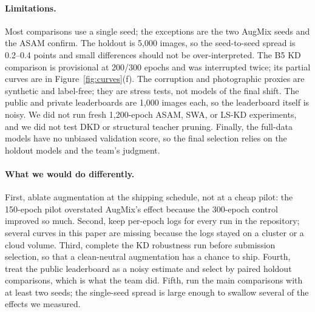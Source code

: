 \paragraph{Limitations.}
Most comparisons use a single seed; the exceptions are the two AugMix seeds and
the ASAM confirm. The holdout is 5,000 images, so the seed-to-seed spread is
0.2--0.4 points and small differences should not be over-interpreted. The B5 KD
comparison is provisional at 200/300 epochs and was interrupted twice; its
partial curves are in Figure~\ref{fig:curves}(f). The corruption and
photographic proxies are synthetic and label-free; they are stress tests, not
models of the final shift. The public and private leaderboards are 1,000 images
each, so the leaderboard itself is noisy. We did not run fresh 1,200-epoch ASAM,
SWA, or LS-KD experiments, and we did not test DKD or structural teacher pruning.
Finally, the full-data models have no unbiased validation score, so the final
selection relies on the holdout models and the team's judgment.

\paragraph{What we would do differently.}
First, ablate augmentation at the shipping schedule, not at a cheap pilot: the
150-epoch pilot overstated AugMix's effect because the 300-epoch control improved
so much. Second, keep per-epoch logs for every run in the repository; several
curves in this paper are missing because the logs stayed on a cluster or a cloud
volume. Third, complete the KD robustness run before submission selection, so
that a clean-neutral augmentation has a chance to ship. Fourth, treat the public
leaderboard as a noisy estimate and select by paired holdout comparisons, which
is what the team did. Fifth, run the main comparisons with at least two seeds;
the single-seed spread is large enough to swallow several of the effects we
measured.
